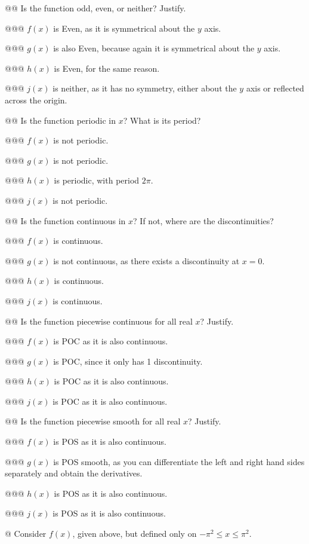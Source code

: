 \documentclass[10pt]{article}
\begin{document}
\begin{easylist}[enumerate]
\noweave

    @@ Is the function odd, even, or neither? Justify.

    @@@ $f(x)$ is Even, as it is symmetrical about the $y$ axis.

    @@@ $g(x)$ is also Even, because again it is symmetrical about the $y$ axis.

    @@@ $h(x)$ is Even, for the same reason.

    @@@ $j(x)$ is neither, as it has no symmetry, either about the $y$ axis or reflected across the origin.

    @@ Is the function periodic in $x$? What is its period?

    @@@ $f(x)$ is not periodic.

    @@@ $g(x)$ is not periodic.

    @@@ $h(x)$ is periodic, with period $2 \pi$.

    @@@ $j(x)$ is not periodic.

    @@ Is the function continuous in $x$? If not, where are the discontinuities?

    @@@ $f(x)$ is continuous.

    @@@ $g(x)$ is not continuous, as there exists a discontinuity at $x=0$.

    @@@ $h(x)$ is continuous.

    @@@ $j(x)$ is continuous.

    @@ Is the function piecewise continuous for all real $x$? Justify.

    @@@ $f(x)$ is POC as it is also continuous.

    @@@ $g(x)$ is POC, since it only has 1 discontinuity.

    @@@ $h(x)$ is POC as it is also continuous.

    @@@ $j(x)$ is POC as it is also continuous.

    @@ Is the function piecewise smooth for all real $x$? Justify.

    @@@ $f(x)$ is POS as it is also continuous.

    @@@ $g(x)$ is POS smooth, as you can differentiate the left and right hand sides separately and obtain the
    derivatives.

    @@@ $h(x)$ is POS as it is also continuous.

    @@@ $j(x)$ is POS as it is also continuous.

    \newpage
    @ Consider $f(x)$, given above, but defined only on $-\pi^2 \le x \le \pi^2$.


\end{easylist}
\end{document}
